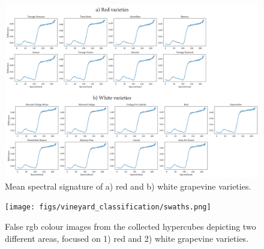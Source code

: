 \begin{figure}[bp]
    \centering
    \includegraphics[width=\linewidth]{figs/vineyard_classification/vineyard_signature_grid.png}
	\caption{Mean spectral signature of a) red and b) white grapevine varieties. }
	\label{fig:vineyard_mean_grid}
\end{figure}

\begin{figure}[bp]
    \centering
    \texttt{[image: figs/vineyard\_classification/swaths.png]}
	\caption{False \acrshort{rgb} colour images from the collected hypercubes depicting two different areas, focused on 1) red and 2) white grapevine varieties.}
	\label{fig:vineyard_swaths}
\end{figure}

